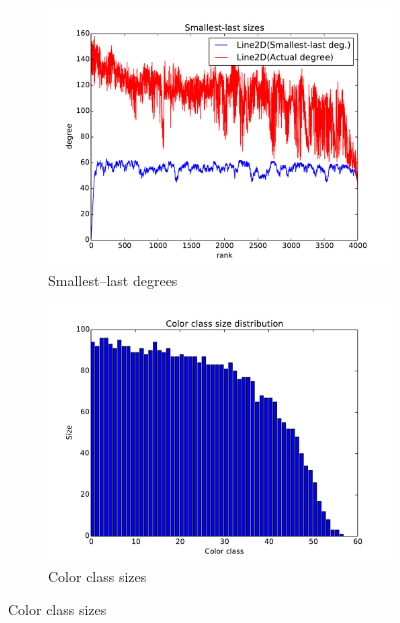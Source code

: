 \documentclass[oneside, titlepage]{scrartcl}
\begin{document}
\begin{figure}[!h]
\begin{subfigure}{0.5\textwidth}
	\centering
	\includegraphics[width=0.9\linewidth]{figures/ordering7.pdf}
	\caption{Smallest--last degrees}
\end{subfigure}%
\begin{subfigure}{0.5\textwidth}
	\centering
	\includegraphics[width=0.9\linewidth]{figures/colors7.pdf}
	\caption{Color class sizes}
\end{subfigure}


\end{figure}
\end{document}
